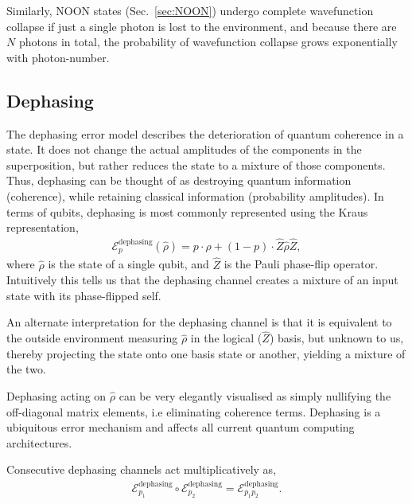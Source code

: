 \documentclass[aps,rmp,twocolumn,amsmath,amssymb,nofootinbib,superscriptaddress]{revtex4}
\begin{document}
Similarly, NOON states (Sec.~\ref{sec:NOON}) undergo complete wavefunction collapse if just a single photon is lost to the environment, and because there are $N$ photons in total, the probability of wavefunction collapse grows exponentially with photon-number.

%
%

\subsection{Dephasing} \label{sec:dephasing_error}

The dephasing error model describes the deterioration of quantum coherence in a state. It does not change the actual amplitudes of the components in the superposition, but rather reduces the state to a mixture of those components. Thus, dephasing can be thought of as destroying quantum information (coherence), while retaining classical information (probability amplitudes). In terms of qubits, dephasing is most commonly represented using the Kraus representation,
\begin{align} \label{eq:dephasing_channel}
\mathcal{E}_p^\mathrm{dephasing}(\hat\rho) = p\cdot\hat\rho + (1-p)\cdot \hat{Z}\hat\rho\hat{Z},
\end{align}
where $\hat\rho$ is the state of a single qubit, and $\hat{Z}$ is the Pauli phase-flip operator. Intuitively this tells us that the dephasing channel creates a mixture of an input state with its phase-flipped self.

An alternate interpretation for the dephasing channel is that it is equivalent to the outside environment measuring $\hat\rho$ in the logical ($\hat{Z}$) basis, but unknown to us, thereby projecting the state onto one basis state or another, yielding a mixture of the two.

Dephasing acting on $\hat\rho$ can be very elegantly visualised as simply nullifying the off-diagonal matrix elements, i.e eliminating coherence terms. Dephasing is a ubiquitous error mechanism and affects all current quantum computing architectures.

Consecutive dephasing channels act multiplicatively as,
\begin{align} \label{eq:multi_deph}
\mathcal{E}_{p_1}^\mathrm{dephasing} \circ \mathcal{E}_{p_2}^\mathrm{dephasing} = \mathcal{E}_{p_1 p_2}^\mathrm{dephasing}.
\end{align}
\end{document}
